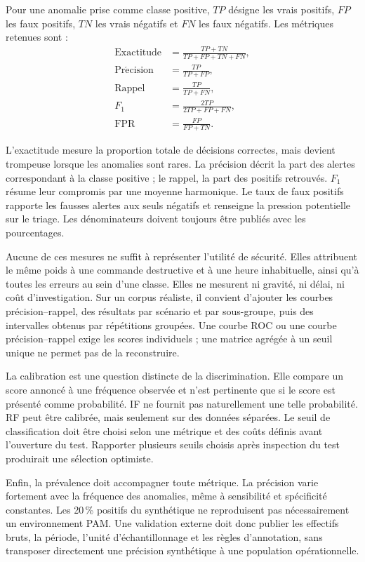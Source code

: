 \documentclass[11pt,a4paper,oneside]{report}
\theoremstyle{definition}
\theoremstyle{plain}
\begin{document}
Pour une anomalie prise comme classe positive, $TP$ désigne les vrais positifs,
$FP$ les faux positifs, $TN$ les vrais négatifs et $FN$ les faux négatifs. Les
métriques retenues sont :
\begin{align}
\mathrm{Exactitude}
  &=\frac{TP+TN}{TP+FP+TN+FN},\\
\mathrm{Pr\acute{e}cision}
  &=\frac{TP}{TP+FP},\\
\mathrm{Rappel}
  &=\frac{TP}{TP+FN},\\
F_1
  &=\frac{2TP}{2TP+FP+FN},\\
\mathrm{FPR}
  &=\frac{FP}{FP+TN}.
\end{align}

L'exactitude mesure la proportion totale de décisions correctes, mais devient
trompeuse lorsque les anomalies sont rares. La précision décrit la part des
alertes correspondant à la classe positive ; le rappel, la part des positifs
retrouvés. $F_1$ résume leur compromis par une moyenne harmonique. Le taux de
faux positifs rapporte les fausses alertes aux seuls négatifs et renseigne la
pression potentielle sur le triage. Les dénominateurs doivent toujours être
publiés avec les pourcentages.

Aucune de ces mesures ne suffit à représenter l'utilité de sécurité. Elles
attribuent le même poids à une commande destructive et à une heure inhabituelle,
ainsi qu'à toutes les erreurs au sein d'une classe. Elles ne mesurent ni
gravité, ni délai, ni coût d'investigation. Sur un corpus réaliste, il convient
d'ajouter les courbes précision--rappel, des résultats par scénario et par
sous-groupe, puis des intervalles obtenus par répétitions groupées. Une courbe
ROC ou une courbe précision--rappel exige les scores individuels ; une matrice
agrégée à un seuil unique ne permet pas de la reconstruire.

La calibration est une question distincte de la discrimination. Elle compare
un score annoncé à une fréquence observée et n'est pertinente que si le score
est présenté comme probabilité. IF ne fournit pas naturellement une telle
probabilité. RF peut être calibrée, mais seulement sur des données séparées.
Le seuil de classification doit être choisi selon une métrique et des coûts
définis avant l'ouverture du test. Rapporter plusieurs seuils choisis après
inspection du test produirait une sélection optimiste.

Enfin, la prévalence doit accompagner toute métrique. La précision varie
fortement avec la fréquence des anomalies, même à sensibilité et spécificité
constantes. Les 20\,\% positifs du synthétique ne reproduisent pas
nécessairement un environnement PAM. Une validation externe doit donc publier
les effectifs bruts, la période, l'unité d'échantillonnage et les règles
d'annotation, sans transposer directement une précision synthétique à une
population opérationnelle.
\end{document}
